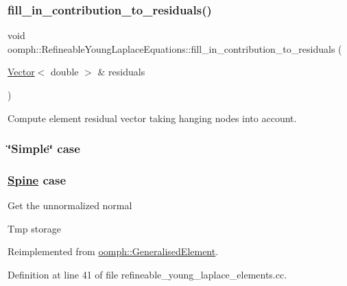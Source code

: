 \subsubsection{\texorpdfstring{fill\+\_\+in\+\_\+contribution\+\_\+to\+\_\+residuals()}{fill\_in\_contribution\_to\_residuals()}}
{\footnotesize\ttfamily void oomph\+::\+Refineable\+Young\+Laplace\+Equations\+::fill\+\_\+in\+\_\+contribution\+\_\+to\+\_\+residuals (\begin{DoxyParamCaption}\item[{\hyperlink{classoomph_1_1Vector}{Vector}$<$ double $>$ \&}]{residuals }\end{DoxyParamCaption})\hspace{0.3cm}{\ttfamily [virtual]}}



Compute element residual vector taking hanging nodes into account. 

\subsubsection*{\char`\"{}\+Simple\char`\"{} case }

\subsubsection*{\hyperlink{classoomph_1_1Spine}{Spine} case }

Get the unnormalized normal

Tmp storage 

Reimplemented from \hyperlink{classoomph_1_1GeneralisedElement_a310c97f515e8504a48179c0e72c550d7}{oomph\+::\+Generalised\+Element}.



Definition at line 41 of file refineable\+\_\+young\+\_\+laplace\+\_\+elements.\+cc.



